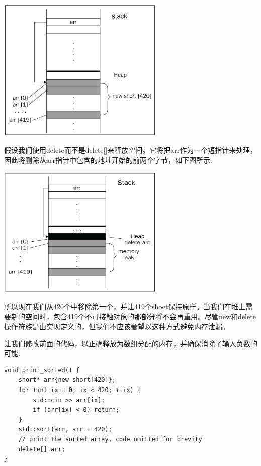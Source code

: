 \begin{center}
	\includegraphics[width=0.6\textwidth]{content/Section-1/Chapter-5/11}
\end{center}

假设我们使用delete而不是delete[]来释放空间。它将把arr作为一个短指针来处理，因此将删除从arr指针中包含的地址开始的前两个字节，如下图所示: \par

\begin{center}
	\includegraphics[width=0.6\textwidth]{content/Section-1/Chapter-5/12}
\end{center}

所以现在我们从420个中移除第一个，并让419个shoet保持原样。当我们在堆上需要新的空间时，包含419个不可接触对象的那部分将不会再重用。尽管new和delete操作符族是由实现定义的，但我们不应该奢望以这种方式避免内存泄漏。 \par
让我们修改前面的代码，以正确释放为数组分配的内存，并确保消除了输入负数的可能: \par

\begin{lstlisting}[caption={}]
void print_sorted() {
	short* arr{new short[420]};
	for (int ix = 0; ix < 420; ++ix) {
		std::cin >> arr[ix];
		if (arr[ix] < 0) return;
	}
	std::sort(arr, arr + 420);
	// print the sorted array, code omitted for brevity
	delete[] arr;
}
\end{lstlisting}

